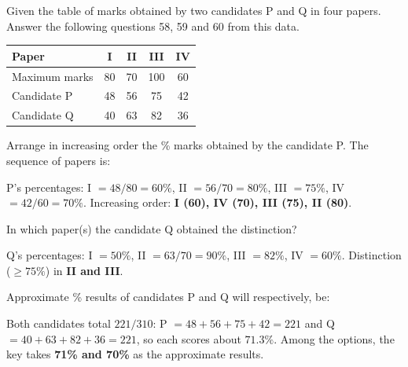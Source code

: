 Given the table of marks obtained by two candidates P and Q in four papers. Answer the following questions 58, 59 and 60 from this data.
\begin{center}\small
\begin{tabular}{lcccc}\toprule \textbf{Paper} & I & II & III & IV\\\midrule
Maximum marks & 80 & 70 & 100 & 60\\ Candidate P & 48 & 56 & 75 & 42\\ Candidate Q & 40 & 63 & 82 & 36\\\bottomrule
\end{tabular}
\end{center}

Arrange in increasing order the \% marks obtained by the candidate P. The sequence of papers is:

P's percentages: I $=48/80=60\%$, II $=56/70=80\%$, III $=75\%$, IV $=42/60=70\%$.
Increasing order: \textbf{I (60), IV (70), III (75), II (80)}.

In which paper(s) the candidate Q obtained the distinction?

Q's percentages: I $=50\%$, II $=63/70=90\%$, III $=82\%$, IV $=60\%$. Distinction ($\ge75\%$) in \textbf{II and III}.

Approximate \% results of candidates P and Q will respectively, be:

Both candidates total $221/310$: P $=48+56+75+42=221$ and Q $=40+63+82+36=221$, so each scores about $71.3\%$. Among the options, the key takes \textbf{71\% and 70\%} as the approximate results.
